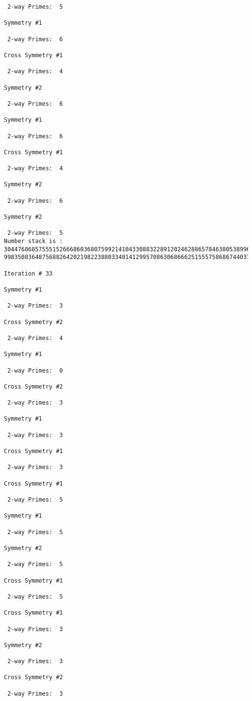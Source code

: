 {{{{\begin{verbatim}
 2-way Primes: 	5

Symmetry #1

 2-way Primes: 	6

Cross Symmetry #1

 2-way Primes: 	4

Symmetry #2

 2-way Primes: 	6

Symmetry #1

 2-way Primes: 	6

Cross Symmetry #1

 2-way Primes: 	4

Symmetry #2

 2-way Primes: 	6

Symmetry #2

 2-way Primes: 	5
Number stack is :
30447686857555152666860368075992141043308832289120246288657846380538996794608835958544046240163340857
99835083648756882642021982238803340141299570863068666251555758686744037580433610426404458595388064976

Iteration #	33

Symmetry #1

 2-way Primes: 	3

Cross Symmetry #2

 2-way Primes: 	4

Symmetry #1

 2-way Primes: 	0

Cross Symmetry #2

 2-way Primes: 	3

Symmetry #1

 2-way Primes: 	3

Cross Symmetry #1

 2-way Primes: 	3

Cross Symmetry #1

 2-way Primes: 	5

Symmetry #1

 2-way Primes: 	5

Symmetry #2

 2-way Primes: 	5

Cross Symmetry #1

 2-way Primes: 	5

Cross Symmetry #1

 2-way Primes: 	3

Symmetry #2

 2-way Primes: 	3

Cross Symmetry #2

 2-way Primes: 	3


\end{verbatim}}}}}
